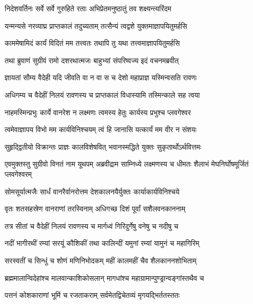 \twolineshloka
{निदेशवर्तिनः सर्वे सर्वे गुरुहिते रताः}
{अभिप्रेतमनुष्ठातुं तव शक्ष्यन्त्यरिंदम} %

\twolineshloka
{यन्मन्यसे नरव्याघ्र प्राप्तकालं तदुच्यताम्}
{तत्सैन्यं त्वद्वशे युक्तमाज्ञापयितुमर्हसि} %

\twolineshloka
{काममेषामिदं कार्यं विदितं मम तत्त्वतः}
{तथापि तु यथा तत्त्वमाज्ञापयितुमर्हसि} %

\twolineshloka
{तथा ब्रुवाणं सुग्रीवं रामो दशरथात्मजः}
{बाहुभ्यां संपरिष्वज्य इदं वचनमब्रवीत्} %

\twolineshloka
{ज्ञायतां सौम्य वैदेही यदि जीवति वा न वा}
{स च देशो महाप्राज्ञ यस्मिन्वसति रावणः} %

\twolineshloka
{अधिगम्य च वैदेहीं निलयं रावणस्य च}
{प्राप्तकालं विधास्यामि तस्मिन्काले सह त्वया} %

\twolineshloka
{नाहमस्मिन्प्रभुः कार्ये वानरेश न लक्ष्मणः}
{त्वमस्य हेतुः कार्यस्य प्रभुश्च प्लवगेश्वर} %

\twolineshloka
{त्वमेवाज्ञापय विभो मम कार्यविनिश्चयम्}
{त्वं हि जानासि यत्कार्यं मम वीर न संशयः} %

\twolineshloka
{सुहृद्द्वितीयो विक्रान्तः प्राज्ञः कालविशेषवित्}
{भवानस्मद्धिते युक्तः सुकृतार्थोऽर्थवित्तमः} %

\threelineshloka
{एवमुक्तस्तु सुग्रीवो विनतं नाम यूथपम्}
{अब्रवीद्राम साम्निध्ये लक्ष्मणस्य च धीमतः}
{शैलाभं मेघनिर्घोषमूर्जितं प्लवगेश्वरम्} %

\twolineshloka
{सोमसूर्यात्मजैः सार्धं वानरैर्वानरोत्तम}
{देशकालनयैर्युक्तः कार्याकार्यविनिश्चये} %

\twolineshloka
{वृतः शतसहस्रेण वानराणां तरस्विनाम्}
{अधिगच्छ दिशं पूर्वां सशैलवनकाननाम्} %

\twolineshloka
{तत्र सीतां च वैदेहीं निलयं रावणस्य च}
{मार्गध्वं गिरिदुर्गेषु वनेषु च नदीषु च} %

\twolineshloka
{नदीं भागीरथीं रम्यां सरयूं कौशिकीं तथा}
{कालिन्दीं यमुनां रम्यां यामुनं च महागिरिम्} %

\twolineshloka
{सरस्वतीं च सिन्धुं च शोणं मणिनिभोदकम्}
{महीं कालमहीं चैव शैलकाननशोभिताम्} %

\twolineshloka
{ब्रह्ममालान्विदेहांश्च मालवान्काशिकोसलान्}
{मागधांश्च महाग्रामान्पुण्ड्रान्वङ्गांस्तथैव च} %

\twolineshloka
{पत्तनं कोशकाराणां भूमिं च रजताकराम्}
{सर्वमेतद्विचेतव्यं मृगयद्भिर्ततस्ततः} %

